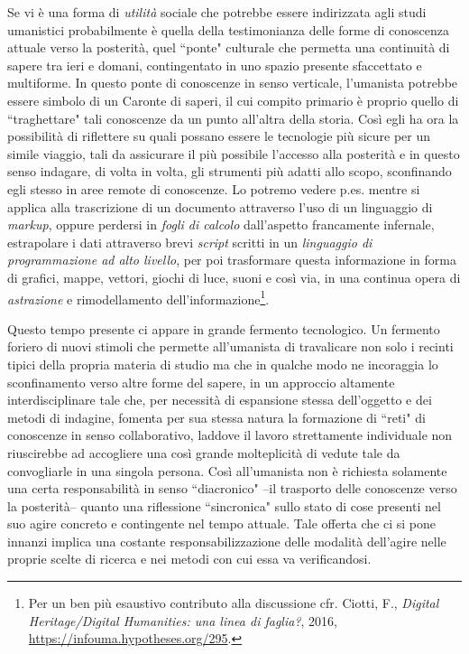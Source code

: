 \documentclass[
  b5paper,
  twoside,
  12pt,
  chapterprefix=false,
  bibliography=totocnumbered,
  parskip=false]{scrbook}
\begin{document}
Se vi è una forma di \emph{utilità} sociale che potrebbe essere indirizzata agli studi umanistici probabilmente è quella della testimonianza delle forme di conoscenza attuale verso la posterità, quel ``ponte" culturale che permetta una continuità di sapere tra ieri e domani, contingentato in uno spazio presente sfaccettato e multiforme.
In questo ponte di conoscenze in senso verticale, l'umanista potrebbe essere simbolo di un Caronte di saperi, il cui compito primario è proprio quello di ``traghettare" tali conoscenze da un punto all'altra della storia. Così egli ha ora la possibilità di riflettere su quali possano essere le tecnologie più sicure per un simile viaggio, tali da assicurare il più possibile l'accesso alla posterità e in questo senso indagare, di volta in volta, gli strumenti più adatti allo scopo, sconfinando egli stesso in aree remote di conoscenze. Lo potremo vedere p.es. mentre si applica alla trascrizione di un documento attraverso l'uso di un linguaggio di \emph{markup}, oppure perdersi in \emph{fogli di calcolo} dall'aspetto francamente infernale, estrapolare i dati attraverso brevi \emph{script} scritti in un \emph{linguaggio di programmazione ad alto livello}, per poi trasformare questa informazione in forma di grafici, mappe, vettori, giochi di luce, suoni e così via, in una continua opera di \emph{astrazione} e rimodellamento dell'informazione\footnote{Per un ben più esaustivo contributo alla discussione cfr. Ciotti, F., \emph{Digital Heritage/Digital Humanities: una linea di faglia?}, 2016, \url{https://infouma.hypotheses.org/295}.}.

Questo tempo presente ci appare in grande fermento tecnologico. Un fermento foriero di nuovi stimoli che permette all'umanista di travalicare non solo i recinti tipici della propria materia di studio ma che in qualche modo ne incoraggia lo sconfinamento verso altre forme del sapere, in un approccio altamente interdisciplinare tale che, per necessità di espansione stessa dell'oggetto e dei metodi di indagine, fomenta per sua stessa natura la formazione di ``reti" di conoscenze in senso collaborativo, laddove il lavoro strettamente individuale non riuscirebbe ad accogliere una così grande molteplicità di vedute tale da convogliarle in una singola persona. Così all'umanista non è richiesta solamente una certa responsabilità in senso ``diacronico" --il trasporto delle conoscenze verso la posterità-- quanto una riflessione ``sincronica" sullo stato di cose presenti nel suo agire concreto e contingente nel tempo attuale. Tale offerta che ci si pone innanzi implica una costante responsabilizzazione delle modalità dell'agire nelle proprie scelte di ricerca e nei metodi con cui essa va verificandosi.
\end{document}
